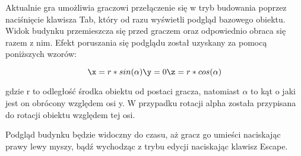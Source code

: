 Aktualnie gra umożliwia graczowi przełączenie się w tryb budowania poprzez naciśnięcie klawisza Tab, który od razu wyświetli podgląd bazowego obiektu. Widok budynku przemieszcza się przed graczem oraz odpowiednio obraca się razem z nim. Efekt poruszania się podglądu został uzyskany za pomocą poniższych wzorów:

\begin{equation*}
\x = r*sin(\alpha)
\y = 0
\z = r*cos(\alpha)
\end{equation*}

gdzie r to odległość środka obiektu od postaci gracza, natomiast \(\alpha\) to kąt o jaki jest on obrócony względem osi y. W przypadku rotacji alpha została przypisana do rotacji obiektu względem tej osi.

Podgląd budynku będzie widoczny do czasu, aż gracz go umieści naciskając prawy lewy myszy, bądź wychodząc z trybu edycji naciskając klawisz Escape.

